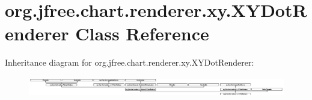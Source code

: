 \hypertarget{classorg_1_1jfree_1_1chart_1_1renderer_1_1xy_1_1_x_y_dot_renderer}{}\section{org.\+jfree.\+chart.\+renderer.\+xy.\+X\+Y\+Dot\+Renderer Class Reference}
\label{classorg_1_1jfree_1_1chart_1_1renderer_1_1xy_1_1_x_y_dot_renderer}
Inheritance diagram for org.\+jfree.\+chart.\+renderer.\+xy.\+X\+Y\+Dot\+Renderer\+:\begin{figure}[H]
\begin{center}
\leavevmode
\includegraphics[height=0.883281cm]{classorg_1_1jfree_1_1chart_1_1renderer_1_1xy_1_1_x_y_dot_renderer}
\end{center}
\end{figure}

